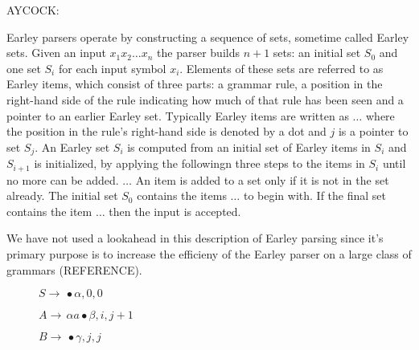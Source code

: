 \begin{isabellebody}
\begin{isamarkuptext}
AYCOCK:

Earley parsers operate by constructing a sequence of sets, sometime called Earley sets. Given an input
$x_1 x_2 \dots x_n$ the parser builds $n+1$ sets: an initial set $S_0$ and one set $S_i$ for each input
symbol $x_i$. Elements of these sets are referred to as Earley items, which consist of three parts:
a grammar rule, a position in the right-hand side of the rule indicating how much of that rule has been
seen and a pointer to an earlier Earley set. Typically Earley items are written as $\dots$ where the position
in the rule's right-hand side is denoted by a dot and $j$ is a pointer to set $S_j$.
An Earley set $S_i$ is computed from an initial set of Earley items in $S_i$ and $S_{i+1}$ is initialized, by
applying the followingn three steps to the items in $S_i$ until no more can be added. $\dots$
An item is added to a set only if it is not in the set already. The initial set $S_0$ contains the items $\dots$
to begin with. If the final set contains the item $\dots$ then the input is accepted.

We have not used a lookahead in this description of Earley parsing since it's primary purpose is to
increase the efficieny of the Earley parser on a large class of grammars (REFERENCE).%
\end{isamarkuptext}\isamarkuptrue%
%
\begin{isamarkuptext}%
\begin{figure}[htpb]
    \centering

    \begin{mathpar}
      \inferrule [Init]
      {\\}
      {$S \rightarrow \, \bullet\alpha, 0, 0$}
  
      {$A \rightarrow \, \alpha a \bullet \beta, i, j+1$}
  
      {$B \rightarrow \, \bullet \gamma, j, j$}
  

\end{mathpar}
\end{figure}
\end{isamarkuptext}
\end{isabellebody}
